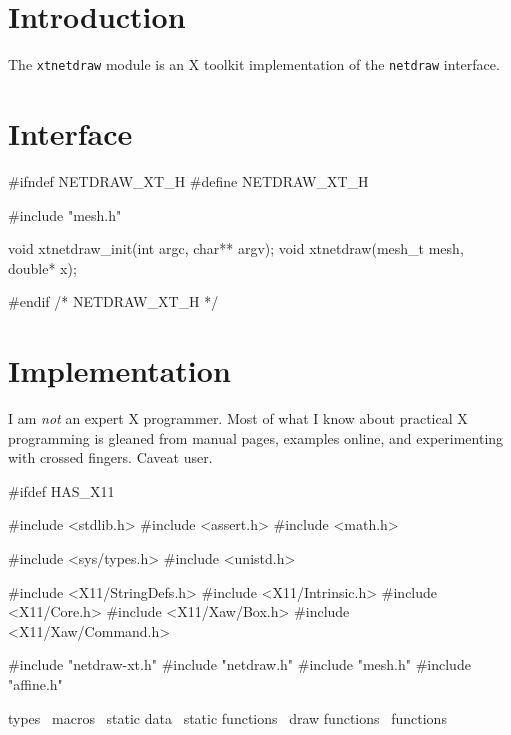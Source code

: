 \section{Introduction}

The {\tt{}xtnetdraw} module is an X toolkit implementation of the
{\tt{}netdraw} interface.


\section{Interface}

\endmoddef
#ifndef NETDRAW_XT_H
#define NETDRAW_XT_H

#include "mesh.h"

void xtnetdraw_init(int argc, char** argv);
void xtnetdraw(mesh_t mesh, double* x);

#endif /* NETDRAW_XT_H */
\nwendcode{}\nwdocspar


\section{Implementation}

I am \emph{not} an expert X programmer.  Most of what I know about
practical X programming is gleaned from manual pages, examples online,
and experimenting with crossed fingers.  Caveat user.

\nwenddocs{}\endmoddef
#ifdef HAS_X11

#include <stdlib.h>
#include <assert.h>
#include <math.h>

#include <sys/types.h>
#include <unistd.h>

#include <X11/StringDefs.h>
#include <X11/Intrinsic.h>
#include <X11/Core.h>
#include <X11/Xaw/Box.h>
#include <X11/Xaw/Command.h>

#include "netdraw-xt.h"
#include "netdraw.h"
#include "mesh.h"
#include "affine.h"

\LA{}types~{\nwtagstyle{}}\RA{}
\LA{}macros~{\nwtagstyle{}}\RA{}
\LA{}static data~{\nwtagstyle{}}\RA{}
\LA{}static functions~{\nwtagstyle{}}\RA{}
\LA{}draw functions~{\nwtagstyle{}}\RA{}
\LA{}functions~{\nwtagstyle{}}\RA{}

